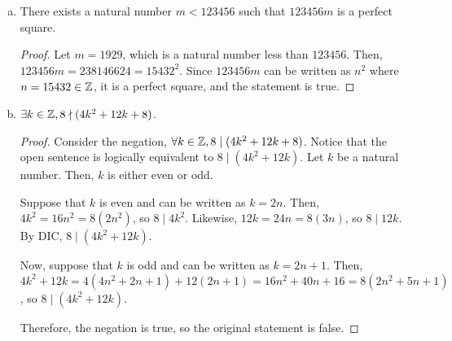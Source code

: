 \begin{enumerate}[(a)]
  \item There exists a natural number $m < 123456$ such that $123456m$ is a perfect square.
        \begin{proof}
          Let $m=1929$, which is a natural number less than $123456$.
          Then, $123456m=238146624=15432^2$.
          Since $123456m$ can be written as $n^2$ where $n=15432\in\mathbb{Z}$, it is a perfect square, and the statement is true.
        \end{proof}

  \item $\exists k\in\mathbb{Z}, 8\nmid(4k^2+12k+8)$.
        \begin{proof}
          Consider the negation, $\forall k\in\mathbb{Z}, 8\mid(4k^2+12k+8)$.
          Notice that the open sentence is logically equivalent to $8 \mid (4k^2+12k)$.
          Let $k$ be a natural number. Then, $k$ is either even or odd.

          Suppose that $k$ is even and can be written as $k=2n$.
          Then, $4k^2=16n^2=8(2n^2)$, so $8 \mid 4k^2$.
          Likewise, $12k=24n=8(3n)$, so $8 \mid 12k$.
          By DIC, $8 \mid (4k^2+12k)$.

          Now, suppose that $k$ is odd and can be written as $k=2n+1$.
          Then, $4k^2+12k = 4(4n^2+2n+1)+12(2n+1) = 16n^2 + 40n + 16 = 8(2n^2+5n+1)$, so $8 \mid (4k^2+12k)$.

          Therefore, the negation is true, so the original statement is false.
        \end{proof}
\end{enumerate}


